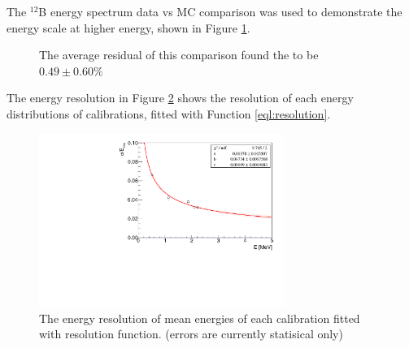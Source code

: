 The $^{12}$B energy spectrum data vs MC comparison was used to demonstrate the energy scale at higher energy, shown in Figure \ref{fig:B12final}. 

\begin{figure}[h!]
\centering
{} \quad
{} \quad
\caption{The average residual of this comparison found the to be $0.49 \pm 0.60\%$}
\label{fig:B12final}
\end{figure}

The energy resolution in Figure \ref{fig:resolution} shows the resolution of each energy distributions of calibrations, fitted with Function \ref{eql:resolution}.

\begin{figure}[h!]
\centering
\includegraphics[width=80mm]{Figures/Resolution.pdf}
\caption{The energy resolution of mean energies of each calibration fitted with resolution function. (errors are currently statisical only)}
\label{fig:resolution}
\end{figure}

